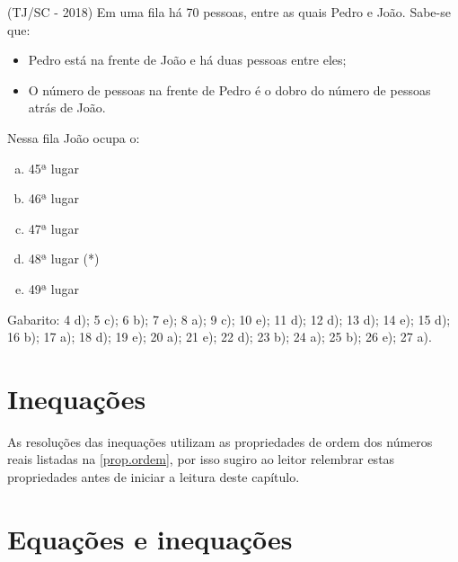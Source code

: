  \begin{exer}
 (TJ/SC - 2018) Em uma fila há 70 pessoas, entre as quais Pedro e João. Sabe-se que:
  \begin{itemize}
   \item Pedro está na frente de João e há duas pessoas entre eles;
   \item O número de pessoas na frente de Pedro é o dobro do número de pessoas atrás de João.
  \end{itemize}
  Nessa fila João ocupa o:
  \begin{enumerate}[a)]
  \item 45ª lugar
  \item 46ª lugar
  \item 47ª lugar
  \item 48ª lugar (*)
  \item 49ª lugar
 \end{enumerate}
 \end{exer}

 Gabarito: 4 d); 5 c); 6 b); 7 e); 8 a); 9 c); 10 e); 11 d); 12 d); 13 d); 14 e); 15 d); 16 b); 17 a); 18 d); 19 e); 20 a); 21 e); 22 d); 23 b); 24 a); 25 b); 26 e); 27 a).

 \chapter{Inequações}

 As resoluções das inequações utilizam as propriedades de ordem dos números reais listadas na \autoref{prop.ordem}, por isso sugiro ao leitor relembrar estas propriedades antes de iniciar a leitura deste capítulo.



 \chapter{Equações e inequações}

